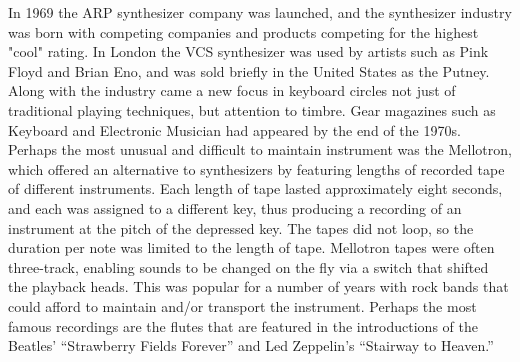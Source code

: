 In 1969 the ARP synthesizer company was launched, and the synthesizer industry was born with competing companies and products competing for the highest "cool" rating. In London the VCS synthesizer was used by artists such as Pink Floyd and Brian Eno, and was sold briefly in the United States as the Putney. Along with the industry came a new focus in keyboard circles not just of traditional playing techniques, but attention to timbre. Gear magazines such as Keyboard and Electronic Musician had appeared by the end of the 1970s.
Perhaps the most unusual and difficult to maintain instrument was the Mellotron, which offered an alternative to synthesizers by featuring lengths of recorded tape of different instruments. Each length of tape lasted approximately eight seconds, and each was assigned to a different key, thus producing a recording of an instrument at the pitch of the depressed key. The tapes did not loop, so the duration per note was limited to the length of tape. Mellotron tapes were often three-track, enabling sounds to be changed on the fly via a switch that shifted the playback heads. This was popular for a number of years with rock bands that could afford to maintain and/or transport the instrument. Perhaps the most famous recordings are the flutes that are featured in the introductions of the Beatles' ``Strawberry Fields Forever'' and Led Zeppelin's ``Stairway to Heaven.''






